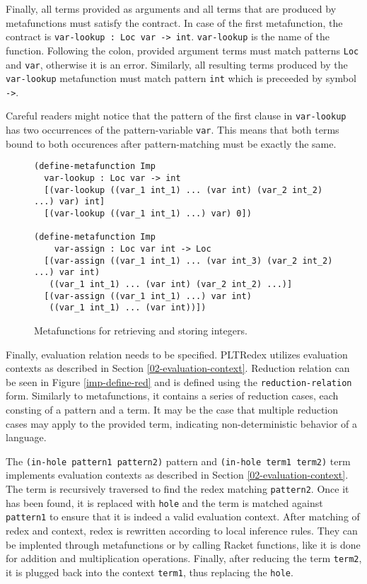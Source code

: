 Finally, all terms provided as arguments and all terms that are produced by metafunctions must satisfy the contract. In case of the first metafunction, the contract is \texttt{var-lookup : Loc var -> int}. \texttt{var-lookup} is the name of the function. Following the colon, provided argument terms must match patterns \texttt{Loc} and \texttt{var}, otherwise it is an error. Similarly, all resulting terms produced by the \texttt{var-lookup} metafunction must match pattern \texttt{int} which is preceeded by symbol \texttt{->}.

Careful readers might notice that the pattern of the first clause in \texttt{var-lookup} has two occurrences of the pattern-variable \texttt{var}. This means that both terms bound to both occurences after pattern-matching must be exactly the same.

\begin{figure}[h]
\begin{verbatim}
(define-metafunction Imp
  var-lookup : Loc var -> int
  [(var-lookup ((var_1 int_1) ... (var int) (var_2 int_2) ...) var) int]
  [(var-lookup ((var_1 int_1) ...) var) 0])

(define-metafunction Imp
    var-assign : Loc var int -> Loc 
  [(var-assign ((var_1 int_1) ... (var int_3) (var_2 int_2) ...) var int)
   ((var_1 int_1) ... (var int) (var_2 int_2) ...)]
  [(var-assign ((var_1 int_1) ...) var int)
   ((var_1 int_1) ... (var int))])
\end{verbatim}
\caption{Metafunctions for retrieving and storing integers.}
\label{imp-define-mf}
\end{figure}

Finally, evaluation relation needs to be specified. PLTRedex utilizes evaluation contexts as described in Section \ref{02-evaluation-context}. Reduction relation can be seen in Figure \ref{imp-define-red} and is defined using the \texttt{reduction-relation} form. Similarly to metafunctions, it contains a series of reduction cases, each consting of a pattern and a term. It may be the case that multiple reduction cases may apply to the provided term, indicating non-deterministic behavior of a language.

The \texttt{(in-hole pattern1 pattern2)} pattern and \texttt{(in-hole term1 term2)} term implements evaluation contexts as described in Section \ref{02-evaluation-context}. The term is recursively traversed to find the redex matching \texttt{pattern2}. Once it has been found, it is replaced with \texttt{hole} and the term is matched against \texttt{pattern1} to ensure that it is indeed a valid evaluation context. After matching of redex and context, redex is rewritten according to local inference rules. They can be implented through metafunctions or by calling Racket functions, like it is done for addition and multiplication operations. Finally, after reducing the term \texttt{term2}, it is plugged back into the context \texttt{term1}, thus replacing the \texttt{hole}.


